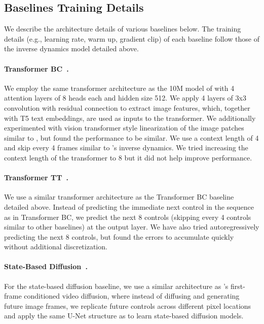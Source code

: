 \subsection{Baselines Training Details}
We describe the architecture details of various baselines below. The training details (e.g., learning rate, warm up, gradient clip) of each baseline follow those of the inverse dynamics model detailed above.
\paragraph{Transformer BC~\citep{reed2022generalist,lee2022multi}.} We employ the same transformer architecture as the 10M model of \citet{lee2022multi} with 4 attention layers of 8 heads each and hidden size 512. We apply 4 layers of 3x3 convolution with residual connection to extract image features, which, together with T5 text embeddings, are used as inputs to the transformer. We additionally experimented with vision transformer style linearization of the image patches similar to \citet{lee2022multi}, but found the performance to be similar. We use a context length of 4 and skip every 4 frames similar to \model's inverse dynamics. We tried increasing the context length of the transformer to 8 but it did not help improve performance.

\paragraph{Transformer TT~\citep{janner2021offline}.} We use a similar transformer architecture as the Transformer BC baseline detailed above. Instead of predicting the immediate next control in the sequence as in Transformer BC, we predict the next 8 controls (skipping every 4 controls similar to other baselines) at the output layer. We have also tried autoregressively predicting the next 8 controls, but found the errors to accumulate quickly without additional discretization.

\paragraph{State-Based Diffusion~\citep{janner2022planning}.} For the state-based diffusion baseline, we use a similar architecture as \model's first-frame conditioned video diffusion, where instead of diffusing and generating future image frames, we replicate future controls across different pixel locations and apply the same U-Net structure as \model to learn state-based diffusion models.

